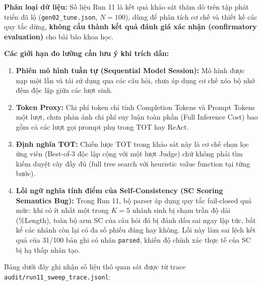 \documentclass[11pt,a4paper]{report}
\begin{document}
\begin{tcolorbox}[title=Minh bạch Phương pháp Luận về Dữ liệu Run 11]
\textbf{Phân loại dữ liệu:} Số liệu Run 11 là kết quả khảo sát thăm dò trên tập phát triển đã lộ (\texttt{gen02\_tune.json}, $N=100$), dùng để phân tích cơ chế và thiết kế các quy tắc dừng, \textbf{không cấu thành kết quả đánh giá xác nhận (confirmatory evaluation)} cho bài báo khoa học.

\textbf{Các giới hạn đo lường cần lưu ý khi trích dẫn:}
\begin{enumerate}[leftmargin=*]
    \item \textbf{Phiên mô hình tuần tự (Sequential Model Session):} Mô hình được nạp một lần và tái sử dụng qua các câu hỏi, chưa áp dụng cơ chế xóa bộ nhớ đệm độc lập giữa các lượt sinh.
    \item \textbf{Token Proxy:} Chi phí token chỉ tính Completion Tokens và Prompt Tokens một lượt, chưa phản ánh chi phí suy luận toàn phần (Full Inference Cost) bao gồm cả các lượt gọi prompt phụ trong TOT hay ReAct.
    \item \textbf{Định nghĩa TOT:} Chiến lược TOT trong khảo sát này là cơ chế chọn lọc ứng viên (Best-of-3 độc lập cộng với một lượt Judge) chứ không phải tìm kiếm duyệt cây đầy đủ (full tree search với heuristic value function tại từng bước).
    \item \textbf{Lỗi ngữ nghĩa tính điểm của Self-Consistency (SC Scoring Semantics Bug):} Trong Run 11, bộ parser áp dụng quy tắc fail-closed quá mức: khi có ít nhất một trong $K=5$ nhánh sinh bị chạm trần độ dài (\%Length), toàn bộ arm SC của câu hỏi đó bị đánh dấu sai ngay lập tức, bất kể các nhánh còn lại có đa số phiếu đúng hay không. Lỗi này làm sai lệch kết quả của 31/100 bản ghi có nhãn \texttt{parsed}, khiến độ chính xác thực tế của SC bị hạ thấp nhân tạo.
\end{enumerate}
\end{tcolorbox}

Bảng dưới đây ghi nhận số liệu thô quan sát được từ trace \texttt{audit/run11\_sweep\_trace.jsonl}:
\end{document}
